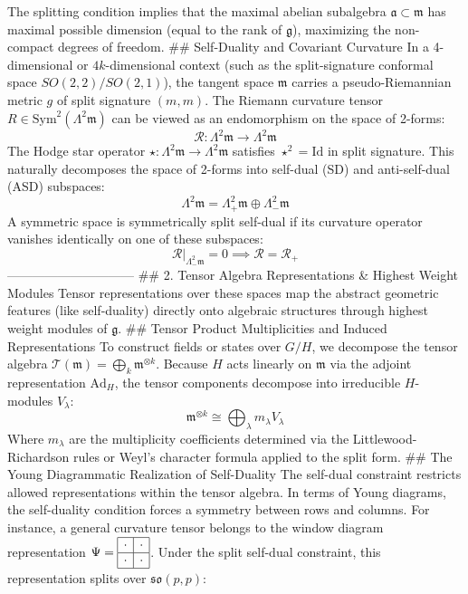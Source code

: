 The splitting condition implies that the maximal abelian subalgebra $\mathfrak{a} \subset \mathfrak{m}$ has maximal possible dimension (equal to the rank of $\mathfrak{g}$), maximizing the non-compact degrees of freedom.
## Self-Duality and Covariant Curvature
In a 4-dimensional or $4k$-dimensional context (such as the split-signature conformal space $SO(2,2)/SO(2,1)$), the tangent space $\mathfrak{m}$ carries a pseudo-Riemannian metric $g$ of split signature $(m, m)$. The Riemann curvature tensor $R \in \text{Sym}^2(\Lambda^2 \mathfrak{m})$ can be viewed as an endomorphism on the space of 2-forms:
$$\mathcal{R}: \Lambda^2 \mathfrak{m} \to \Lambda^2 \mathfrak{m}$$ 
The Hodge star operator $\star: \Lambda^2 \mathfrak{m} \to \Lambda^2 \mathfrak{m}$ satisfies $\star^2 = \text{Id}$ in split signature. This naturally decomposes the space of 2-forms into self-dual (SD) and anti-self-dual (ASD) subspaces:
$$\Lambda^2 \mathfrak{m} = \Lambda^2_+ \mathfrak{m} \oplus \Lambda^2_- \mathfrak{m}$$ 
A symmetric space is symmetrically split self-dual if its curvature operator vanishes identically on one of these subspaces:
$$\mathcal{R}\vert_{\Lambda^2_- \mathfrak{m}} = 0 \implies \mathcal{R} = \mathcal{R}_+$$ 
------------------------------
## 2. Tensor Algebra Representations & Highest Weight Modules
Tensor representations over these spaces map the abstract geometric features (like self-duality) directly onto algebraic structures through highest weight modules of $\mathfrak{g}$.
## Tensor Product Multiplicities and Induced Representations
To construct fields or states over $G/H$, we decompose the tensor algebra $\mathcal{T}(\mathfrak{m}) = \bigoplus_{k} \mathfrak{m}^{\otimes k}$. Because $H$ acts linearly on $\mathfrak{m}$ via the adjoint representation $\text{Ad}_H$, the tensor components decompose into irreducible $H$-modules $V_\lambda$:
$$\mathfrak{m}^{\otimes k} \cong \bigoplus_{\lambda} m_\lambda V_\lambda$$ 
Where $m_\lambda$ are the multiplicity coefficients determined via the Littlewood-Richardson rules or Weyl's character formula applied to the split form.
## The Young Diagrammatic Realization of Self-Duality
The self-dual constraint restricts allowed representations within the tensor algebra. In terms of Young diagrams, the self-duality condition forces a symmetry between rows and columns.
For instance, a general curvature tensor belongs to the window diagram representation $\Psi = \begin{array}{|c|c|} \hline \cdot & \cdot \\ \hline \cdot & \cdot \\ \hline \end{array}$. Under the split self-dual constraint, this representation splits over $\mathfrak{so}(p,p)$:
